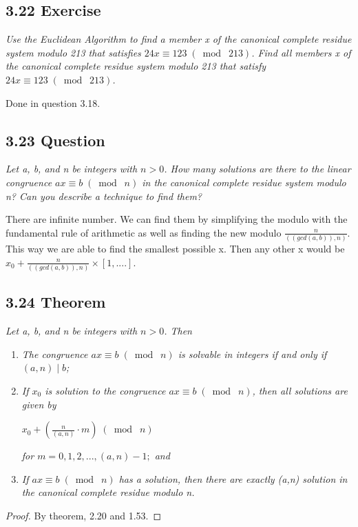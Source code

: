 \documentclass{article}
\begin{document}
\subsection*{3.22 Exercise} 
\quad \textit{Use the Euclidean Algorithm to find a member x of the canonical complete residue system modulo 213 that satisfies $24x \equiv 123 \;(\bmod\; 213)$. Find all members x of the canonical complete residue system modulo 213 that satisfy $24x \equiv 123 \;(\bmod\; 213)$.}

Done in question 3.18.

\subsection*{3.23 Question} 
\quad \textit{Let a, b, and n be integers with $n>0$. How many solutions are there to the linear congruence $ax \equiv b \;(\bmod\; n)$ in the canonical complete residue system modulo n? Can you describe a technique to find them?}

There are infinite number. We can find them by simplifying the modulo with the fundamental rule of arithmetic as well as finding the new modulo $\frac{n}{((gcd(a, b)),n)}$. This way we are able to find the smallest possible x. Then any other x would be $x_0 + \frac{n}{((gcd(a, b)),n)} \times [1,....]$. 

\subsection*{3.24 Theorem} 
\quad \textit{Let a, b, and n be integers with $n > 0$. Then}
\begin{enumerate}
    \item \textit{The congruence $ax \equiv b \;(\bmod\; n)$ is solvable in integers if and only if $(a,n) \mid b$;}
    \item \textit{If $x_0$ is solution to the congruence $ax \equiv b \;(\bmod\; n)$, then all solutions are given by}
        \begin{center}
            $x_0 + (\frac{n}{(a,n)} \cdot m) \;(\bmod\; n)$
        \end{center}
        \textit{for $m = 0, 1, 2,...,(a,n)-1;$ and}
    \item \textit{If $ax \equiv b \;(\bmod\; n)$ has a solution, then there are exactly (a,n) solution in the canonical complete residue modulo n.}
\end{enumerate}

\begin{proof}
By theorem, 2.20 and 1.53.
\end{proof}
\end{document}
